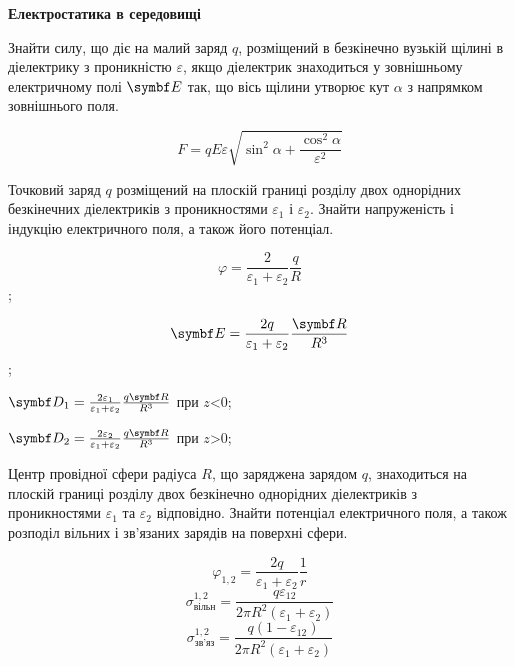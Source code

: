 \documentclass[]{ProblemBook}
\begin{document}
\begin{center}
\textbf{Електростатика в середовищі}
\end{center}

\begin{problem}
 Знайти силу, що діє на малий заряд $q$, розміщений в безкінечно вузькій щілині в діелектрику з проникністю $ε$, якщо діелектрик знаходиться у зовнішньому електричному полі $\Efield$ так, що вісь щілини утворює кут $α$ з напрямком зовнішнього поля.   
	\begin{solution}
	\[F = qE\varepsilon \sqrt {{{\sin }^2}\alpha  + \frac{{{{\cos }^2}\alpha }}{{{\varepsilon ^2}}}} \] 
\end{solution}
\end{problem}

\begin{problem}
    Точковий заряд $q$ розміщений на плоскій границі розділу двох однорідних безкінечних діелектриків з проникностями $ε_{1}$ і $ε_{2}$. Знайти напруженість і індукцію електричного поля, а також його потенціал. 
	\begin{solution}
\[\varphi  = \frac{2}{{{\varepsilon _1} + {\varepsilon _2}}}\frac{q}{R}\];

\[\Efield = \frac{{2q}}{{{\varepsilon _1} + {\varepsilon _2}}}\frac{{\vect{R}}}{{{R^3}}}\];

\begin{center}
${\Dfield_1} = \frac{{2{\varepsilon _1}}}{{{\varepsilon _1} + {\varepsilon _2}}}\frac{{q\vect{R}}}{{{R^3}}}$  при $z$<0;

\end{center}
\begin{center}
${\Dfield_2} = \frac{{2{\varepsilon _2}}}{{{\varepsilon _1} + {\varepsilon _2}}}\frac{{q\vect{R}}}{{{R^3}}}$  при $z$>0;
\end{center}
\end{solution}
\end{problem}

\begin{problem}
    Центр провідної сфери радіуса $R$, що заряджена зарядом $q$, знаходиться на плоскій границі розділу двох безкінечно однорідних діелектриків з проникностями $ε_{1}$ та $ε_{2}$ відповідно. Знайти потенціал електричного поля, а також розподіл вільних і зв’язаних зарядів на поверхні сфери.
	\begin{solution}
	\[{\varphi _{1,2}} = \frac{{2q}}{{{\varepsilon _1} + {\varepsilon _2}}}\frac{1}{r}\]
    \[\sigma_{\text{вільн}}^{1,2} = \frac{{q{\varepsilon _{12}}}}{{2\pi {R^2}({\varepsilon _1} + {\varepsilon _2})}}\]
    \[\sigma_{\text{зв'яз}}^{1,2} = \frac{{q(1 - {\varepsilon _{12}})}}{{2\pi {R^2}({\varepsilon _1} + {\varepsilon _2})}}\]
\end{solution}
\end{problem}
\end{document}
